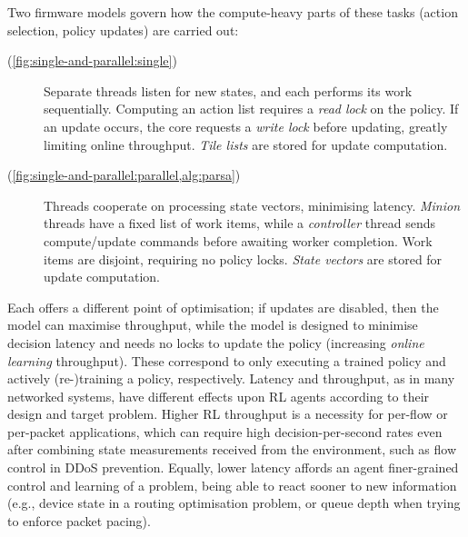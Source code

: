Two firmware models govern how the compute-heavy parts of these tasks (action selection, policy updates) are carried out:
\begin{description}
	\item[\Indfw{} (\cref{fig:single-and-parallel:single})] Separate threads listen for new states, and each performs its work sequentially. Computing an action list requires a \emph{read lock} on the policy. If an update occurs, the core requests a \emph{write lock} before updating, greatly limiting online throughput. \emph{Tile lists} are stored for update computation.
	\item[\Coopfw{} (\cref{fig:single-and-parallel:parallel,alg:parsa})] Threads cooperate on processing state vectors, minimising latency. \emph{Minion} threads have a fixed list of work items, while a \emph{controller} thread sends compute/update commands before awaiting worker completion. Work items are disjoint, requiring no policy locks. \emph{State vectors} are stored for update computation.
\end{description}
Each offers a different point of optimisation; if updates are disabled, then the \indfw{} model can maximise throughput, while the \coopfw{} model is designed to minimise decision latency and needs no locks to update the policy (increasing \emph{online learning} throughput).
These correspond to only executing a trained policy and actively (re-)training a policy, respectively.
Latency and throughput, as in many networked systems, have different effects upon RL agents according to their design and target problem.
Higher RL throughput is a necessity for per-flow or per-packet applications, which can require high decision-per-second rates even after combining state measurements received from the environment, such as flow control in DDoS prevention.
Equally, lower latency affords an agent finer-grained control and learning of a problem, being able to react sooner to new information (e.g., device state in a routing optimisation problem, or queue depth when trying to enforce packet pacing).

